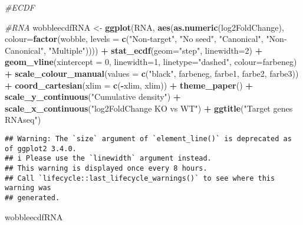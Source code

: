 \documentclass[
]{article}
\newenvironment{Shaded}{\begin{snugshade}}{\end{snugshade}}
\newcommand{\AttributeTok}[1]{\textcolor[rgb]{0.13,0.29,0.53}{#1}}
\newcommand{\CommentTok}[1]{\textcolor[rgb]{0.56,0.35,0.01}{\textit{#1}}}
\newcommand{\DecValTok}[1]{\textcolor[rgb]{0.00,0.00,0.81}{#1}}
\newcommand{\FunctionTok}[1]{\textcolor[rgb]{0.13,0.29,0.53}{\textbf{#1}}}
\newcommand{\NormalTok}[1]{#1}
\newcommand{\OtherTok}[1]{\textcolor[rgb]{0.56,0.35,0.01}{#1}}
\newcommand{\SpecialCharTok}[1]{\textcolor[rgb]{0.81,0.36,0.00}{\textbf{#1}}}
\newcommand{\StringTok}[1]{\textcolor[rgb]{0.31,0.60,0.02}{#1}}
\begin{document}
\begin{Shaded}
\begin{Highlighting}[]
\CommentTok{\#ECDF}

\CommentTok{\#RNA}
\NormalTok{wobbleecdfRNA }\OtherTok{\textless{}{-}} \FunctionTok{ggplot}\NormalTok{(RNA, }\FunctionTok{aes}\NormalTok{(}\FunctionTok{as.numeric}\NormalTok{(log2FoldChange), }\AttributeTok{colour=}\FunctionTok{factor}\NormalTok{(wobble, }\AttributeTok{levels =} \FunctionTok{c}\NormalTok{(}\StringTok{"Non{-}target"}\NormalTok{, }\StringTok{"No seed"}\NormalTok{, }\StringTok{"Canonical"}\NormalTok{, }\StringTok{"Non{-}Canonical"}\NormalTok{, }\StringTok{"Multiple"}\NormalTok{)))) }\SpecialCharTok{+} 
  \FunctionTok{stat\_ecdf}\NormalTok{(}\AttributeTok{geom=}\StringTok{"step"}\NormalTok{, }\AttributeTok{linewidth=}\DecValTok{2}\NormalTok{) }\SpecialCharTok{+}
  \FunctionTok{geom\_vline}\NormalTok{(}\AttributeTok{xintercept =} \DecValTok{0}\NormalTok{, }\AttributeTok{linewidth=}\DecValTok{1}\NormalTok{, }\AttributeTok{linetype=}\StringTok{"dashed"}\NormalTok{, }\AttributeTok{colour=}\NormalTok{farbeneg) }\SpecialCharTok{+}
  \FunctionTok{scale\_colour\_manual}\NormalTok{(}\AttributeTok{values =} \FunctionTok{c}\NormalTok{(}\StringTok{"black"}\NormalTok{, farbeneg, farbe1, farbe2, farbe3)) }\SpecialCharTok{+}
  \FunctionTok{coord\_cartesian}\NormalTok{(}\AttributeTok{xlim =} \FunctionTok{c}\NormalTok{(}\SpecialCharTok{{-}}\NormalTok{xlim, xlim)) }\SpecialCharTok{+} 
  \FunctionTok{theme\_paper}\NormalTok{() }\SpecialCharTok{+}
  \FunctionTok{scale\_y\_continuous}\NormalTok{(}\StringTok{"Cumulative density"}\NormalTok{) }\SpecialCharTok{+} \FunctionTok{scale\_x\_continuous}\NormalTok{(}\StringTok{"log2FoldChange KO vs WT"}\NormalTok{) }\SpecialCharTok{+}
  \FunctionTok{ggtitle}\NormalTok{(}\StringTok{"Target genes RNAseq"}\NormalTok{)}
\end{Highlighting}
\end{Shaded}

\begin{verbatim}
## Warning: The `size` argument of `element_line()` is deprecated as of ggplot2 3.4.0.
## i Please use the `linewidth` argument instead.
## This warning is displayed once every 8 hours.
## Call `lifecycle::last_lifecycle_warnings()` to see where this warning was
## generated.
\end{verbatim}

\begin{Shaded}
\begin{Highlighting}[]
\NormalTok{wobbleecdfRNA}
\end{Highlighting}
\end{Shaded}
\end{document}
